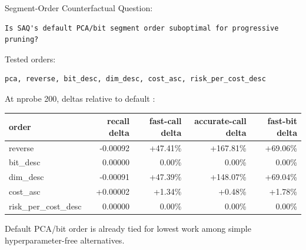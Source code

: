 \documentclass[aspectratio=169,10pt]{beamer}
\newcommand{\code}[1]{\texttt{\detokenize{#1}}}
\begin{document}
\begin{frame}[fragile]{Segment-Order Counterfactual}
\scriptsize
Question:
\begin{lstlisting}
Is SAQ's default PCA/bit segment order suboptimal for progressive pruning?
\end{lstlisting}

Tested orders:
\begin{lstlisting}
pca, reverse, bit_desc, dim_desc, cost_asc, risk_per_cost_desc
\end{lstlisting}

At nprobe 200, deltas relative to default \code{pca}:

\begin{tabular}{lrrrr}
\toprule
order & recall delta & fast-call delta & accurate-call delta & fast-bit delta \\
\midrule
reverse & -0.00092 & +47.41\% & +167.81\% & +69.06\% \\
bit\_desc & 0.00000 & 0.00\% & 0.00\% & 0.00\% \\
dim\_desc & -0.00091 & +47.39\% & +148.07\% & +69.04\% \\
cost\_asc & +0.00002 & +1.34\% & +0.48\% & +1.78\% \\
risk\_per\_cost\_desc & 0.00000 & 0.00\% & 0.00\% & 0.00\% \\
\bottomrule
\end{tabular}

\vspace{0.8em}
\small
Default PCA/bit order is already tied for lowest work among simple
hyperparameter-free alternatives.
\end{frame}
\end{document}
